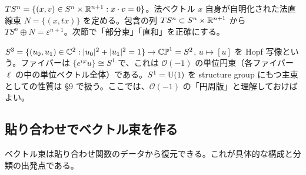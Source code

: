 \begin{ex}[$S^n$ の接束と法束]\label{C:ex:TSn}
$TS^n=\{(x,v)\in S^n\times\mathbb R^{n+1}:x\cdot v=0\}$。法ベクトル $x$ 自身が自明化された法直線束 $N=\{(x,tx)\}$ を定める。包含の列 $TS^n\subset S^n\times\mathbb R^{n+1}$ から $TS^n\oplus N=\varepsilon^{n+1}$。次節で「部分束」「直和」を正確にする。
\end{ex}

\begin{ex}[Hopf 束]\label{C:ex:Hopf}
$S^3=\{(u_0,u_1)\in\mathbb C^2:|u_0|^2+|u_1|^2=1\}\to\mathbb{CP}^1=S^2$, $u\mapsto[u]$ を Hopf 写像という。ファイバーは $\{e^{i\varphi}u\}\cong S^1$ で、これは $\mathcal O(-1)$ の単位円束（各ファイバー $\ell$ の中の単位ベクトル全体）である。$S^1=\mathrm{U}(1)$ を structure group にもつ主束としての性質は §9 で扱う。ここでは、$\mathcal O(-1)$ の「円周版」と理解しておけばよい。
\end{ex}

\subsection{貼り合わせでベクトル束を作る}
ベクトル束は貼り合わせ関数のデータから復元できる。これが具体的な構成と分類の出発点である。


